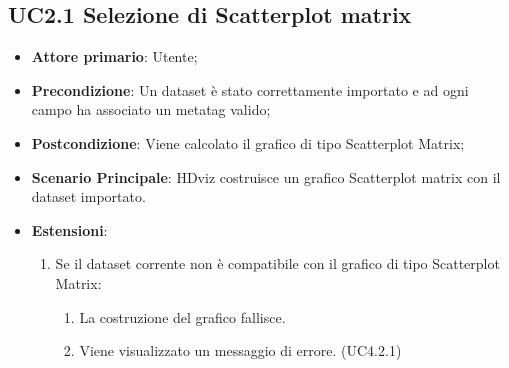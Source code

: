 \subsection{UC2.1 Selezione di Scatterplot matrix}
\label{ssub:UC2.1}
\begin{itemize}

    \item \textbf{Attore primario}: Utente;

    \item \textbf{Precondizione}:   Un dataset è stato correttamente importato e ad ogni campo ha associato
                                    un metatag valido;

    \item \textbf{Postcondizione}:  Viene calcolato il grafico di tipo Scatterplot Matrix;

	\item \textbf{Scenario Principale}: HDviz costruisce un grafico Scatterplot matrix con il dataset 
										importato.
	
	\item \textbf{Estensioni}:
	\begin{enumerate}
		\item Se il dataset corrente non è compatibile con il grafico di tipo Scatterplot Matrix:
		\begin{enumerate}
			\item La costruzione del grafico fallisce.
			\item Viene visualizzato un messaggio di errore. (UC4.2.1)
		\end{enumerate}
	\end{enumerate}
\end{itemize}


